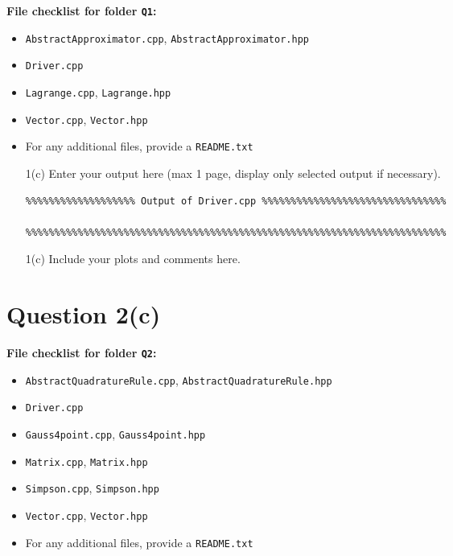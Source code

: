 \documentclass[a4,10pt,fleqn]{article}  %
\newcommand{\il}[1]{\texttt{#1}}
\begin{document}
\textbf{File checklist for folder \il{Q1}:}
\begin{itemize}
 \item \il{AbstractApproximator.cpp}, \il{AbstractApproximator.hpp}
 \item \il{Driver.cpp}
 \item \il{Lagrange.cpp}, \il{Lagrange.hpp}
 \item \il{Vector.cpp}, \il{Vector.hpp}
 \item For any additional files, provide a \il{README.txt}
\end{itemize}

\vspace{\baselineskip}
\begin{enumerate}

\item[1(c)] Enter your output here (max 1 page, display only selected output if necessary).

\begin{verbatim}
%%%%%%%%%%%%%%%%%%% Output of Driver.cpp %%%%%%%%%%%%%%%%%%%%%%%%%%%%%%%%

%%%%%%%%%%%%%%%%%%%%%%%%%%%%%%%%%%%%%%%%%%%%%%%%%%%%%%%%%%%%%%%%%%%%%%%%%
\end{verbatim}

\item[1(c)] Include your plots and comments here.


\end{enumerate}

\clearpage

\section*{Question 2(c)}

\textbf{File checklist for folder \il{Q2}:}
\begin{itemize}
 \item \il{AbstractQuadratureRule.cpp}, \il{AbstractQuadratureRule.hpp}
 \item \il{Driver.cpp}
 \item \il{Gauss4point.cpp}, \il{Gauss4point.hpp}
 \item \il{Matrix.cpp}, \il{Matrix.hpp}
 \item \il{Simpson.cpp}, \il{Simpson.hpp}
 \item \il{Vector.cpp}, \il{Vector.hpp}
 \item For any additional files, provide a \il{README.txt}
\end{itemize}
\end{document}
